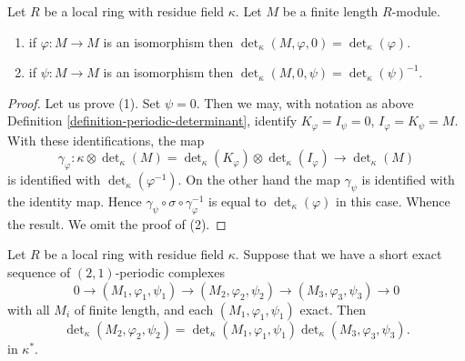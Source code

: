 \begin{lemma}
\label{lemma-periodic-determinant-easy-case}
Let $R$ be a local ring with residue field $\kappa$.
Let $M$ be a finite length $R$-module.
\begin{enumerate}
\item if $\varphi : M \to M$ is an isomorphism then
$\det_\kappa(M, \varphi, 0) = \det_\kappa(\varphi)$.
\item if $\psi : M \to M$ is an isomorphism then
$\det_\kappa(M, 0, \psi) = \det_\kappa(\psi)^{-1}$.
\end{enumerate}
\end{lemma}

\begin{proof}
Let us prove (1). Set $\psi = 0$. Then we may, with notation
as above Definition \ref{definition-periodic-determinant}, identify
$K_\varphi = I_\psi = 0$, $I_\varphi = K_\psi = M$.
With these identifications, the map
$$
\gamma_\varphi :
\kappa \otimes \det\nolimits_\kappa(M)
=
\det\nolimits_\kappa(K_\varphi)
\otimes
\det\nolimits_\kappa(I_\varphi)
\longrightarrow
\det\nolimits_\kappa(M)
$$
is identified with $\det_\kappa(\varphi^{-1})$. On the other hand the
map $\gamma_\psi$ is identified with the identity map. Hence
$\gamma_\psi \circ \sigma \circ \gamma_\varphi^{-1}$ is equal
to $\det_\kappa(\varphi)$ in this case. Whence the result.
We omit the proof of (2).
\end{proof}

\begin{lemma}
\label{lemma-periodic-determinant}
Let $R$ be a local ring with residue field $\kappa$.
Suppose that we have a short exact sequence of
$(2, 1)$-periodic complexes
$$
0 \to (M_1, \varphi_1, \psi_1)
\to (M_2, \varphi_2, \psi_2)
\to (M_3, \varphi_3, \psi_3)
\to 0
$$
with all $M_i$ of finite length, and each $(M_1, \varphi_1, \psi_1)$ exact.
Then
$$
\det\nolimits_\kappa(M_2, \varphi_2, \psi_2) =
\det\nolimits_\kappa(M_1, \varphi_1, \psi_1)
\det\nolimits_\kappa(M_3, \varphi_3, \psi_3).
$$
in $\kappa^*$.
\end{lemma}

